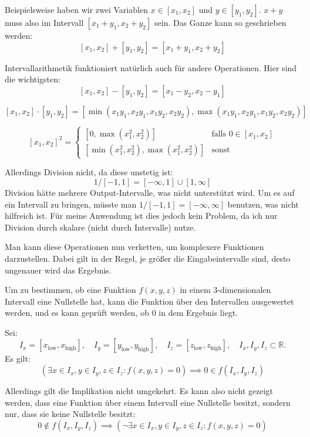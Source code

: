 \documentclass[
	ngerman,%
	accentcolor=9c,%
	ruledheaders=section,%
	class=report,%
	thesis={type=bachelor},%
	fontsize=11pt,%
	parskip=half-,%
	custommargins=true,%
	marginpar=false,%
]{tudapub}
\begin{document}
Beispielsweise haben wir zwei Variablen $x \in [x_1,x_2]$ und $y \in [y_1,y_2]$. $x+y$ muss also im Intervall $[x_1+y_1,x_2+y_2]$ sein.
Das Ganze kann so geschrieben werden:
\[
[x_1,x_2]+[y_1,y_2]=[x_1+y_1,x_2+y_2]
\]

Intervallarithmetik funktioniert natürlich auch für andere Operationen. Hier sind die wichtigsten:
\[
[x_1,x_2]-[y_1,y_2]=[x_1-y_2,x_2-y_1]
\]

\[
[x_1,x_2] \cdot [y_1,y_2]=[\min(x_1 y_1,x_2 y_1,x_1 y_2,x_2 y_2),\max(x_1 y_1,x_2 y_1,x_1 y_2,x_2 y_2)]
\]

\[
[x_1,x_2]^2 = 
\begin{cases} 
[0, \max(x_1^2, x_2^2)] & \text{falls } 0 \in [x_1,x_2] \\
[\min(x_1^2, x_2^2), \max(x_1^2, x_2^2)] & \text{sonst}
\end{cases}
\]

Allerdings Division nicht, da diese unstetig ist:
\[
1/[-1,1] = [-\infty,1] \cup [1,\infty]
\]
Division hätte mehrere Output-Intervalle, was nicht unterstützt wird. Um es auf ein Intervall zu bringen, müsste man $1/[-1,1] = [-\infty,\infty]$ benutzen, was nicht hilfreich ist. Für meine Anwendung ist dies jedoch kein Problem, da ich nur Division durch skalare (nicht durch Intervalle) nutze.

Man kann diese Operationen nun verketten, um komplexere Funktionen darzustellen. 
Dabei gilt in der Regel, je größer die Eingabeintervalle sind, desto ungenauer wird das Ergebnis.


Um zu bestimmen, ob eine Funktion $f(x,y,z)$ in einem 3-dimensionalen Intervall eine Nullstelle hat, kann die Funktion über den Intervallen ausgewertet werden, und es kann geprüft werden, ob $0$ in dem Ergebnis liegt.

Sei:
\[
I_x = [x_{\text{low}}, x_{\text{high}}], \quad
I_y = [y_{\text{low}}, y_{\text{high}}], \quad
I_z = [z_{\text{low}}, z_{\text{high}}], \quad
I_x, I_y, I_z \subset \mathbb{R}.
\]
Es gilt:
\[
 (\exists x \in I_x,y \in I_y,z \in I_z: f(x,y,z)=0)  \implies  0 \in f(I_x,I_y,I_z)  
\]

Allerdings gilt die Implikation nicht umgekehrt. Es kann also nicht gezeigt werden, dass eine Funktion über einem Intervall eine Nullstelle besitzt, sondern nur, dass sie keine Nullstelle besitzt:
\[
   0 \notin f(I_x,I_y,I_z) \implies (\neg\exists x \in I_x,y \in I_y,z \in I_z: f(x,y,z)=0)  
\]
\end{document}
